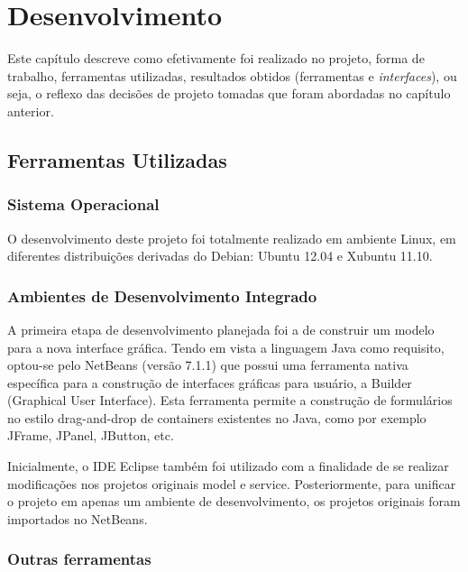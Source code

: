 
\chapter{Desenvolvimento} %

Este capítulo descreve como efetivamente foi realizado no projeto, forma de trabalho, ferramentas utilizadas, resultados obtidos (ferramentas e \emph{interfaces}), ou seja, o reflexo das decisões de projeto tomadas que foram abordadas no capítulo anterior.

\section{Ferramentas Utilizadas}
\subsection{Sistema Operacional}

O desenvolvimento deste projeto foi totalmente realizado em ambiente Linux, em diferentes distribuições derivadas do Debian: Ubuntu 12.04 e Xubuntu 11.10.

\subsection{Ambientes de Desenvolvimento Integrado}

A primeira etapa de desenvolvimento planejada foi a de construir um modelo para a nova interface gráfica. Tendo em vista a linguagem Java como requisito, optou-se pelo  NetBeans (versão 7.1.1) que possui uma ferramenta nativa específica para a construção de interfaces gráficas para usuário, a  Builder (Graphical User Interface). Esta ferramenta permite a construção de formulários no estilo drag-and-drop de containers existentes no Java, como por exemplo JFrame, JPanel, JButton, etc.

Inicialmente, o IDE Eclipse também foi utilizado com a finalidade de se realizar modificações nos projetos originais model e service. Posteriormente, para unificar o projeto em apenas um ambiente de desenvolvimento, os projetos originais foram importados no NetBeans.

\subsection{Outras ferramentas}

